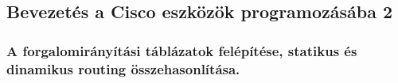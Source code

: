 \subsection{Bevezetés a Cisco eszközök programozásába 2}
\subsubsection{A forgalomirányítási táblázatok felépítése, statikus és dinamikus routing összehasonlítása.}